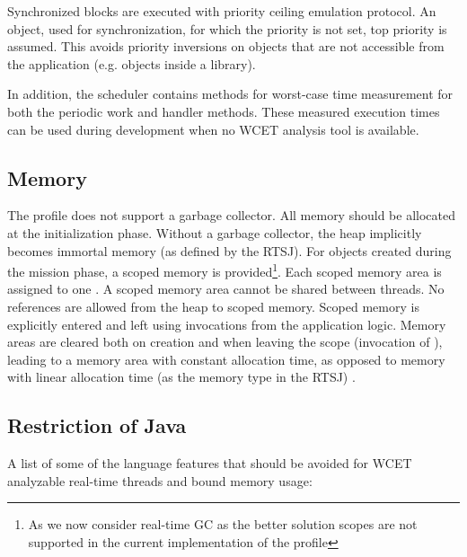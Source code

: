 Synchronized blocks are executed with priority ceiling emulation
protocol. An object, used for synchronization, for which the
priority is not set, top priority is assumed. This avoids priority
inversions on objects that are not accessible from the application
(e.g. objects inside a library).

In addition, the scheduler contains methods for worst-case time
measurement for both the periodic work and handler methods. These
measured execution times can be used during development when no WCET
analysis tool is available.

\subsection{Memory}

The profile does not support a garbage collector. All memory should
be allocated at the initialization phase. Without a garbage
collector, the heap implicitly becomes immortal memory (as defined
by the RTSJ). For objects created during the mission phase, a scoped
memory is provided\footnote{As we now consider real-time GC as the
better solution scopes are not supported in the current
implementation of the profile}. Each scoped memory area is assigned
to one . A scoped memory area cannot be shared
between threads. No references are allowed from the heap to scoped
memory. Scoped memory is explicitly entered and left using
invocations from the application logic. Memory areas are cleared
both on creation and when leaving the scope (invocation of
), leading to a memory area with constant
allocation time, as opposed to memory with linear allocation time
(as the memory type  in the RTSJ)
\cite{Corsaro:2003:DPR}.


\subsection{Restriction of Java}

A list of some of the language features that should be avoided for
WCET analyzable real-time threads and bound memory usage:


